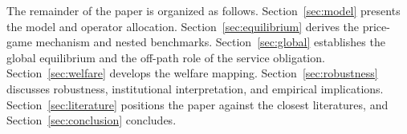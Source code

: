 The remainder of the paper is organized as follows. Section~\ref{sec:model} presents the model and operator allocation. Section~\ref{sec:equilibrium} derives the price-game mechanism and nested benchmarks. Section~\ref{sec:global} establishes the global equilibrium and the off-path role of the service obligation. Section~\ref{sec:welfare} develops the welfare mapping. Section~\ref{sec:robustness} discusses robustness, institutional interpretation, and empirical implications. Section~\ref{sec:literature} positions the paper against the closest literatures, and Section~\ref{sec:conclusion} concludes.
